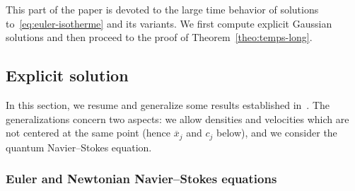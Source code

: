 This part of the paper is devoted to the large time behavior of solutions to~\eqref{eq:euler-isotherme} and its variants. We first compute explicit Gaussian solutions and then proceed to the proof of Theorem~\ref{theo:temps-long}.

\subsection{Explicit solution}\label{sec:explicit}

In this section, we resume and generalize some results established in~\cite{Yuen12,CFY17}. The generalizations concern two aspects: we allow densities and velocities which are not centered at the same point (hence $\overline x_j$ and $c_j$ below), and we consider the quantum Navier--Stokes equation.

\subsubsection{Euler and Newtonian Navier--Stokes equations}

